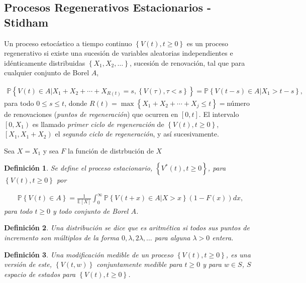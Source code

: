 \documentclass{article}
\newtheorem{Def}{Definición}
\newcommand{\esp}{\mathbb{E}}
\newcommand{\prob}{\mathbb{P}}
\begin{document}
\subsection{Procesos Regenerativos Estacionarios - Stidham \cite{Stidham}}


Un proceso estoc\'astico a tiempo continuo $\left\{V\left(t\right),t\geq0\right\}$ es un proceso regenerativo si existe una sucesi\'on de variables aleatorias independientes e id\'enticamente distribuidas $\left\{X_{1},X_{2},\ldots\right\}$, sucesi\'on de renovaci\'on, tal que para cualquier conjunto de Borel $A$, 

\begin{eqnarray*}
\prob\left\{V\left(t\right)\in A|X_{1}+X_{2}+\cdots+X_{R\left(t\right)}=s,\left\{V\left(\tau\right),\tau<s\right\}\right\}=\prob\left\{V\left(t-s\right)\in A|X_{1}>t-s\right\},
\end{eqnarray*}
para todo $0\leq s\leq t$, donde $R\left(t\right)=\max\left\{X_{1}+X_{2}+\cdots+X_{j}\leq t\right\}=$n\'umero de renovaciones ({\emph{puntos de regeneraci\'on}}) que ocurren en $\left[0,t\right]$. El intervalo $\left[0,X_{1}\right)$ es llamado {\emph{primer ciclo de regeneraci\'on}} de $\left\{V\left(t \right),t\geq0\right\}$, $\left[X_{1},X_{1}+X_{2}\right)$ el {\emph{segundo ciclo de regeneraci\'on}}, y as\'i sucesivamente.

Sea $X=X_{1}$ y sea $F$ la funci\'on de distrbuci\'on de $X$


\begin{Def}
Se define el proceso estacionario, $\left\{V^{*}\left(t\right),t\geq0\right\}$, para $\left\{V\left(t\right),t\geq0\right\}$ por

\begin{eqnarray*}
\prob\left\{V\left(t\right)\in A\right\}=\frac{1}{\esp\left[X\right]}\int_{0}^{\infty}\prob\left\{V\left(t+x\right)\in A|X>x\right\}\left(1-F\left(x\right)\right)dx,
\end{eqnarray*} 
para todo $t\geq0$ y todo conjunto de Borel $A$.
\end{Def}

\begin{Def}
Una distribuci\'on se dice que es {\emph{aritm\'etica}} si todos sus puntos de incremento son m\'ultiplos de la forma $0,\lambda, 2\lambda,\ldots$ para alguna $\lambda>0$ entera.
\end{Def}


\begin{Def}
Una modificaci\'on medible de un proceso $\left\{V\left(t\right),t\geq0\right\}$, es una versi\'on de este, $\left\{V\left(t,w\right)\right\}$ conjuntamente medible para $t\geq0$ y para $w\in S$, $S$ espacio de estados para $\left\{V\left(t\right),t\geq0\right\}$.
\end{Def}
\end{document}
